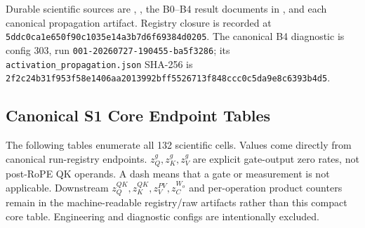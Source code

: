 \documentclass[10pt]{article}
\begin{document}
Durable scientific sources are
,
, the B0--B4 result documents
in , and each canonical propagation artifact.
Registry closure is recorded at
\texttt{5ddc0ca1e650f90c1035e14a3b7d6f69384d0205}. The canonical B4 diagnostic
is config 303, run \texttt{001-20260727-190455-ba5f3286}; its
\texttt{activation\_propagation.json} SHA-256 is
\texttt{2f2c24b31f953f58e1406aa2013992bff5526713f848ccc0c5da9e8c6393b4d5}.

\FloatBarrier
\clearpage
\appendix
\begin{landscape}
\pagestyle{empty}
\section{Canonical S1 Core Endpoint Tables}

The following tables enumerate all 132 scientific cells. Values come directly
from canonical run-registry endpoints. \(z_Q^g,z_K^g,z_V^g\) are explicit
gate-output zero rates, not post-RoPE QK operands. A dash means that a gate or
measurement is not applicable. Downstream
\(z_Q^{QK},z_K^{QK},z_V^{PV},z_C^{W_o}\) and per-operation product counters
remain in the machine-readable registry/raw artifacts rather than this compact
core table. Engineering and diagnostic configs are intentionally excluded.


\end{landscape}
\ClearShipoutPictureFG
\pagestyle{plain}
\end{document}
